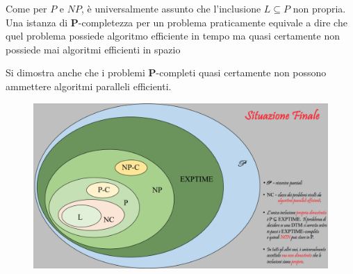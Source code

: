 Come per $P$ e $NP$, è universalmente assunto che l'inclusione $L \subseteq P$ non propria. Una istanza di $\mathbf{P}$-completezza per un problema praticamente equivale a dire che quel problema possiede algoritmo efficiente in tempo ma quasi certamente non possiede mai algoritmi efficienti in spazio

Si dimostra anche che i problemi $\mathbf{P}$-completi quasi certamente non possono ammettere algoritmi paralleli efficienti. \vspace{5cm}

\begin{figure}[H]
  \centering
  \includegraphics[width=1\textwidth]{img/finale}
\end{figure}


